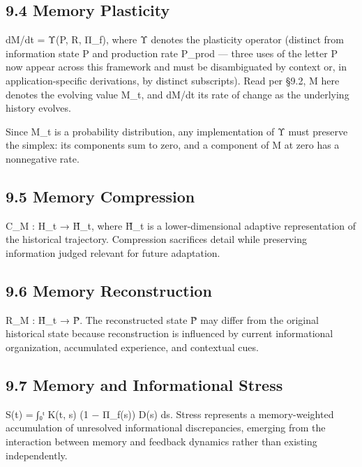 \documentclass[
]{article}
\begin{document}
\hypertarget{memory-plasticity}{%
\subsection{9.4 Memory Plasticity}\label{memory-plasticity}}

dM/dt = Υ(P, R, Π\_f), where Υ denotes the plasticity operator (distinct
from information state P and production rate P\_prod --- three uses of
the letter P now appear across this framework and must be disambiguated
by context or, in application-specific derivations, by distinct
subscripts). Read per §9.2, M here denotes the evolving value M\_t, and
dM/dt its rate of change as the underlying history evolves.

Since M\_t is a probability distribution, any implementation of Υ must
preserve the simplex: its components sum to zero, and a component of M
at zero has a nonnegative rate.

\hypertarget{memory-compression}{%
\subsection{9.5 Memory Compression}\label{memory-compression}}

C\_M : H\_t → H̃\_t, where H̃\_t is a lower-dimensional adaptive
representation of the historical trajectory. Compression sacrifices
detail while preserving information judged relevant for future
adaptation.

\hypertarget{memory-reconstruction}{%
\subsection{9.6 Memory Reconstruction}\label{memory-reconstruction}}

R\_M : H̃\_t → P̃. The reconstructed state P̃ may differ from the original
historical state because reconstruction is influenced by current
informational organization, accumulated experience, and contextual cues.

\hypertarget{memory-and-informational-stress}{%
\subsection{9.7 Memory and Informational
Stress}\label{memory-and-informational-stress}}

S(t) = ∫₀ᵗ K(t, s) (1 − Π\_f(s)) D(s) ds. Stress represents a
memory-weighted accumulation of unresolved informational discrepancies,
emerging from the interaction between memory and feedback dynamics
rather than existing independently.
\end{document}
